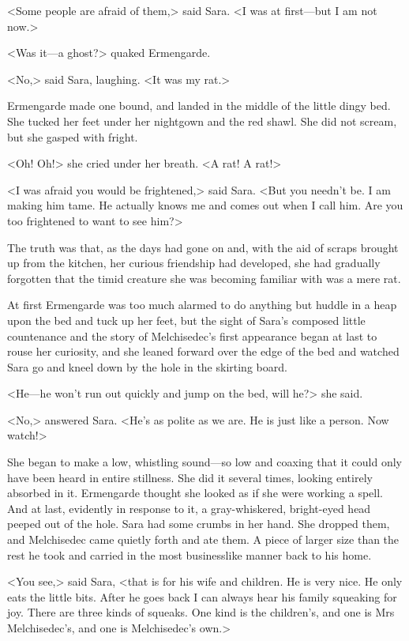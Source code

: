 <Some people are afraid of them,> said Sara. <I was at first—but I am not now.>

<Was it—a ghost?> quaked Ermengarde.

<No,> said Sara, laughing. <It was my rat.>

Ermengarde made one bound, and landed in the middle of the little dingy bed. She tucked her feet under her nightgown and the red shawl. She did not scream, but she gasped with fright.

<Oh! Oh!> she cried under her breath. <A rat! A rat!>

<I was afraid you would be frightened,> said Sara. <But you needn't be. I am making him tame. He actually knows me and comes out when I call him. Are you too frightened to want to see him?>

The truth was that, as the days had gone on and, with the aid of scraps brought up from the kitchen, her curious friendship had developed, she had gradually forgotten that the timid creature she was becoming familiar with was a mere rat.

At first Ermengarde was too much alarmed to do anything but huddle in a heap upon the bed and tuck up her feet, but the sight of Sara's composed little countenance and the story of Melchisedec's first appearance began at last to rouse her curiosity, and she leaned forward over the edge of the bed and watched Sara go and kneel down by the hole in the skirting board.

<He—he won't run out quickly and jump on the bed, will he?> she said.

<No,> answered Sara. <He's as polite as we are. He is just like a person. Now watch!>

She began to make a low, whistling sound—so low and coaxing that it could only have been heard in entire stillness. She did it several times, looking entirely absorbed in it. Ermengarde thought she looked as if she were working a spell. And at last, evidently in response to it, a gray-whiskered, bright-eyed head peeped out of the hole. Sara had some crumbs in her hand. She dropped them, and Melchisedec came quietly forth and ate them. A piece of larger size than the rest he took and carried in the most businesslike manner back to his home.

<You see,> said Sara, <that is for his wife and children. He is very nice. He only eats the little bits. After he goes back I can always hear his family squeaking for joy. There are three kinds of squeaks. One kind is the children's, and one is Mrs Melchisedec's, and one is Melchisedec's own.>

